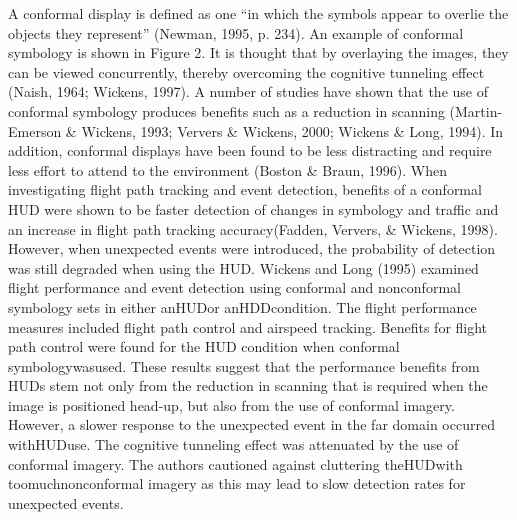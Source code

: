 \documentclass[utf8,bachelor,manualbib]{gradu3}
\begin{document}
A conformal display is defined as one “in which the symbols appear to overlie
the objects they represent” (Newman, 1995, p. 234). An example of conformal
symbology is shown in Figure 2. It is thought that by overlaying the images,
they can be viewed concurrently, thereby overcoming the cognitive tunneling effect
(Naish, 1964; Wickens, 1997).
A number of studies have shown that the use of conformal symbology produces
benefits such as a reduction in scanning (Martin-Emerson \& Wickens, 1993;
Ververs \& Wickens, 2000; Wickens \& Long, 1994). In addition, conformal displays
have been found to be less distracting and require less effort to attend to the
environment (Boston \& Braun, 1996). When investigating flight path tracking and
event detection, benefits of a conformal HUD were shown to be faster detection of
changes in symbology and traffic and an increase in flight path tracking accuracy(Fadden, Ververs, \& Wickens, 1998). However, when unexpected events were introduced,
the probability of detection was still degraded when using the HUD.
Wickens and Long (1995) examined flight performance and event detection using
conformal and nonconformal symbology sets in either anHUDor anHDDcondition.
The flight performance measures included flight path control and airspeed
tracking. Benefits for flight path control were found for the HUD condition when
conformal symbologywasused. These results suggest that the performance benefits
from HUDs stem not only from the reduction in scanning that is required when the
image is positioned head-up, but also from the use of conformal imagery. However,
a slower response to the unexpected event in the far domain occurred withHUDuse.
The cognitive tunneling effect was attenuated by the use of conformal imagery. The
authors cautioned against cluttering theHUDwith toomuchnonconformal imagery
as this may lead to slow detection rates for unexpected events. \citep{crawford2006}
\end{document}

